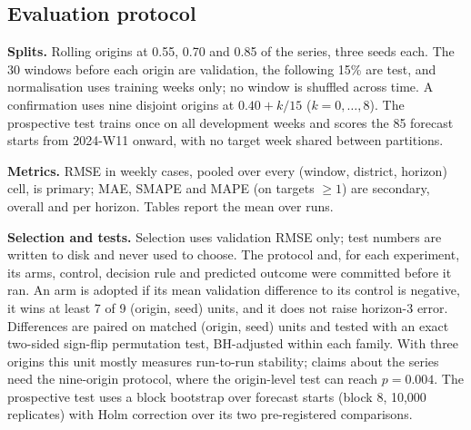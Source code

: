 \subsection{Evaluation protocol}
\label{sec:protocol}
\textbf{Splits.} Rolling origins at 0.55, 0.70 and 0.85 of the series, three seeds each.
The 30 windows before each origin are validation, the following 15\% are test, and
normalisation uses training weeks only; no window is shuffled across time. A
confirmation uses nine disjoint origins at $0.40+k/15$ ($k=0,\dots,8$). The
prospective test trains once on all development weeks and scores the 85 forecast
starts from 2024-W11 onward, with no target week shared between partitions.

\textbf{Metrics.} RMSE in weekly cases, pooled over every (window, district, horizon)
cell, is primary; MAE, SMAPE and MAPE (on targets $\ge1$) are secondary, overall and
per horizon. Tables report the mean over runs.

\textbf{Selection and tests.} Selection uses validation RMSE only; test numbers are
written to disk and never used to choose. The protocol and, for each experiment, its
arms, control, decision rule and predicted outcome were committed before it ran. An
arm is adopted if its mean validation difference to its control is negative, it wins
at least 7 of 9 (origin, seed) units, and it does not raise horizon-3 error.
Differences are paired on matched (origin, seed) units and tested with an exact
two-sided sign-flip permutation test, BH-adjusted within each family. With three
origins this unit mostly measures run-to-run stability; claims about the series need
the nine-origin protocol, where the origin-level test can reach $p=0.004$. The
prospective test uses a block bootstrap over forecast starts (block 8, 10{,}000
replicates) with Holm correction over its two pre-registered comparisons.

